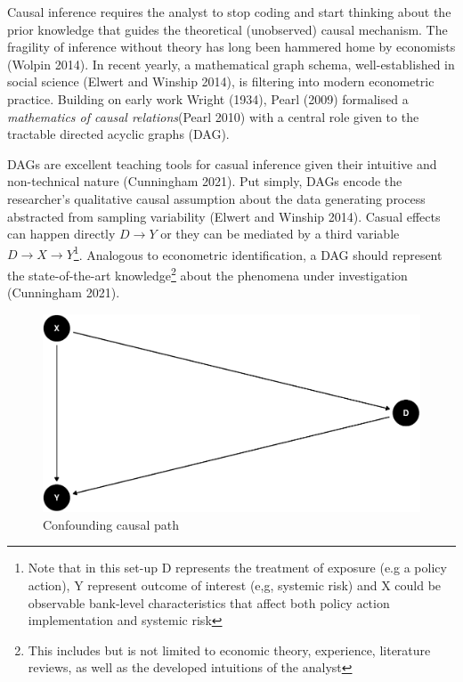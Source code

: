 \documentclass[
  10pt,
]{article}
\begin{document}
Causal inference requires the analyst to stop coding and start thinking
about the prior knowledge that guides the theoretical (unobserved)
causal mechanism. The fragility of inference without theory has long
been hammered home by economists (Wolpin 2014). In recent yearly, a
mathematical graph schema, well-established in social science (Elwert
and Winship 2014), is filtering into modern econometric practice.
Building on early work Wright (1934), Pearl (2009) formalised a
\emph{mathematics of causal relations}(Pearl 2010) with a central role
given to the tractable directed acyclic graphs (DAG).

DAGs are excellent teaching tools for casual inference given their
intuitive and non-technical nature (Cunningham 2021). Put simply, DAGs
encode the researcher's qualitative causal assumption about the data
generating process abstracted from sampling variability (Elwert and
Winship 2014). Casual effects can happen directly \(D \to Y\) or they
can be mediated by a third variable \(D \to X \to Y\)\footnote{Note that
  in this set-up D represents the treatment of exposure (e.g a policy
  action), Y represent outcome of interest (e,g, systemic risk) and X
  could be observable bank-level characteristics that affect both policy
  action implementation and systemic risk}. Analogous to econometric
identification, a DAG should represent the state-of-the-art
knowledge\footnote{This includes but is not limited to economic theory,
  experience, literature reviews, as well as the developed intuitions of
  the analyst} about the phenomena under investigation (Cunningham
2021).

\begin{figure}[H]
\includegraphics{figures/paper-unnamed-chunk-2-1} \caption{Confounding causal path}\label{fig:unnamed-chunk-2}
\end{figure}
\end{document}
